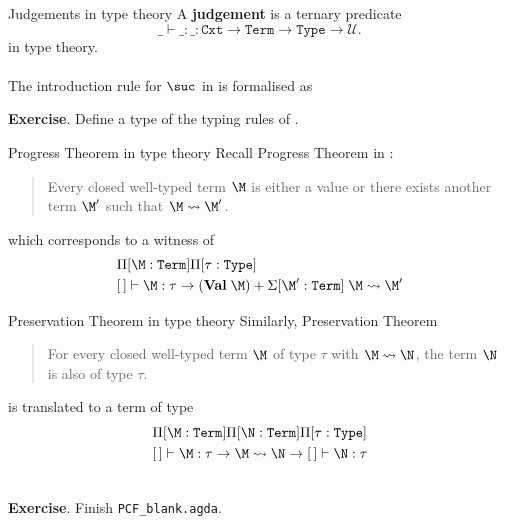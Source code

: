 \begin{frame}{Judgements in type theory}
  A \textbf{judgement} is a ternary predicate 
  \[
    {\_\!\!\vdash\!\!\_\!\!:\!\!\_} : \mathtt{Cxt} \to
    \mathtt{Term} \to \mathtt{Type} \to \mathcal{U}.
  \]
  in type theory. 
  \\~\\
  The introduction rule for $\suc$ in \PCF{} is formalised as
  \begin{center}
  \end{center}
  \textbf{Exercise}. Define a type of the typing rules of \PCF.
\end{frame}

\begin{frame}{Progress Theorem in type theory}
  Recall Progress Theorem in \PCF: 
  \begin{quote}
    Every closed well-typed \PCF{} term $\M$ is either a value or there exists
    another term $\M'$ such that $\M \leadsto \M'$. 
  \end{quote} 
  which corresponds to a witness of 
  \begin{align*}
    & \Pi[ \M : \texttt{Term}]\Pi[ \tau : \texttt{Type} ] \\
    & [\,] \vdash \M : \tau \to (\mathbf{Val}\;\M) +
    \Sigma [ \M' : \mathtt{Term} ]\;
    \M \leadsto \M'
  \end{align*}
\end{frame}

\begin{frame}{Preservation Theorem in type theory}
  Similarly, Preservation Theorem 
  \begin{quote}
    For every closed well-typed \PCF{} term $\M$ of type $\tau$
    with $\M \leadsto \N$, the term $\N$ is also of type $\tau$.
  \end{quote}
  is translated to a term of type
  \begin{align*}
    & \Pi[ \M : \texttt{Term}]\Pi[ \N : \texttt{Term} ] \Pi[ \tau :
    \texttt{Type} ] \\
    & [\,] \vdash \M : \tau \to \M \leadsto \N \to [\,] \vdash \N : \tau
  \end{align*}

  ~\\
  \textbf{Exercise}. Finish \texttt{PCF\_blank.agda}. 
\end{frame}


